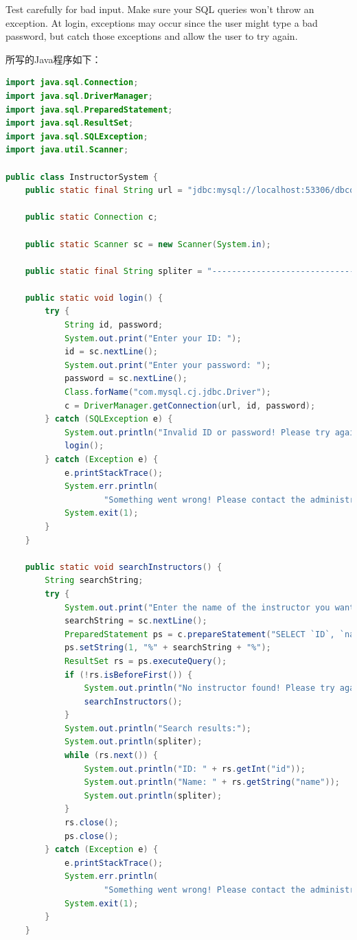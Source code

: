 \documentclass{article}
\begin{document}
Test carefully for bad input. Make sure your SQL queries won’t throw an exception. At login, exceptions may occur since the user might type a bad password, but catch those exceptions and allow the user to try again.

所写的Java程序如下：

\begin{lstlisting}[language=java]
import java.sql.Connection;
import java.sql.DriverManager;
import java.sql.PreparedStatement;
import java.sql.ResultSet;
import java.sql.SQLException;
import java.util.Scanner;

public class InstructorSystem {
    public static final String url = "jdbc:mysql://localhost:53306/dbcourse?useSSL=false&allowPublicKeyRetrieval=true";

    public static Connection c;

    public static Scanner sc = new Scanner(System.in);

    public static final String spliter = "----------------------------------------";

    public static void login() {
        try {
            String id, password;
            System.out.print("Enter your ID: ");
            id = sc.nextLine();
            System.out.print("Enter your password: ");
            password = sc.nextLine();
            Class.forName("com.mysql.cj.jdbc.Driver");
            c = DriverManager.getConnection(url, id, password);
        } catch (SQLException e) {
            System.out.println("Invalid ID or password! Please try again!");
            login();
        } catch (Exception e) {
            e.printStackTrace();
            System.err.println(
                    "Something went wrong! Please contact the administrator for help or try again later!(check the error message above)");
            System.exit(1);
        }
    }

    public static void searchInstructors() {
        String searchString;
        try {
            System.out.print("Enter the name of the instructor you want to search for: ");
            searchString = sc.nextLine();
            PreparedStatement ps = c.prepareStatement("SELECT `ID`, `name` FROM `instructor` WHERE `name` LIKE ?");
            ps.setString(1, "%" + searchString + "%");
            ResultSet rs = ps.executeQuery();
            if (!rs.isBeforeFirst()) {
                System.out.println("No instructor found! Please try again!");
                searchInstructors();
            }
            System.out.println("Search results:");
            System.out.println(spliter);
            while (rs.next()) {
                System.out.println("ID: " + rs.getInt("id"));
                System.out.println("Name: " + rs.getString("name"));
                System.out.println(spliter);
            }
            rs.close();
            ps.close();
        } catch (Exception e) {
            e.printStackTrace();
            System.err.println(
                    "Something went wrong! Please contact the administrator for help or try again later!(check the error message above)");
            System.exit(1);
        }
    }


\end{lstlisting}
\end{document}
